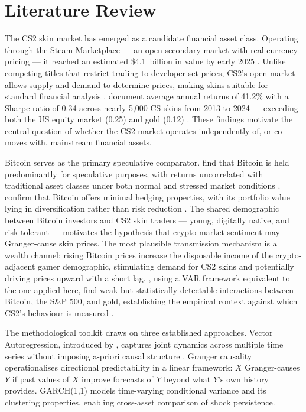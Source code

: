 \section{Literature Review}
\label{sec:literature}

The CS2 skin market has emerged as a candidate financial asset class. Operating
through the Steam Marketplace --- an open secondary market with real-currency
pricing --- it reached an estimated \$4.1~billion in value by early 2025
\cite{guedefernandez2025ai}. Unlike competing titles that restrict trading to
developer-set prices, CS2's open market allows supply and demand to determine
prices, making skins suitable for standard financial analysis
\cite{zhou2024cs2valorant}. \citeauthor{dobrynskaya2025videogame} document
average annual returns of 41.2\% with a Sharpe ratio of 0.34 across nearly
5,000 CS skins from 2013 to 2024 --- exceeding both the US equity market (0.25)
and gold (0.12) \cite{dobrynskaya2025videogame}. These findings motivate the
central question of whether the CS2 market operates independently of, or
co-moves with, mainstream financial assets.

Bitcoin serves as the primary speculative comparator. \citeauthor{baur2018bitcoin}
find that Bitcoin is held predominantly for speculative purposes, with returns
uncorrelated with traditional asset classes under both normal and stressed market
conditions \cite{baur2018bitcoin}. \citeauthor{bouri2017hedge} confirm that
Bitcoin offers minimal hedging properties, with its portfolio value lying in
diversification rather than risk reduction \cite{bouri2017hedge}. The shared
demographic between Bitcoin investors and CS2 skin traders --- young, digitally
native, and risk-tolerant --- motivates the hypothesis that crypto market
sentiment may Granger-cause skin prices. The most plausible transmission
mechanism is a wealth channel: rising Bitcoin prices increase the disposable
income of the crypto-adjacent gamer demographic, stimulating demand for CS2
skins and potentially driving prices upward with a short lag. \citeauthor{akin2024fluctuations},
using a VAR framework equivalent to the one applied here, find weak but
statistically detectable interactions between Bitcoin, the S\&P 500, and gold,
establishing the empirical context against which CS2's behaviour is measured
\cite{akin2024fluctuations}.

The methodological toolkit draws on three established approaches. Vector
Autoregression, introduced by \citeauthor{sims1980macroeconomics}, captures
joint dynamics across multiple time series without imposing a-priori causal
structure \cite{sims1980macroeconomics}. Granger causality
\cite{granger1969causal} operationalises directional predictability in a
linear framework: $X$ Granger-causes $Y$ if past values of $X$ improve
forecasts of $Y$ beyond what $Y$'s own history provides. GARCH(1,1) \cite{bollerslev1986garch} models time-varying
conditional variance and its clustering properties, enabling cross-asset
comparison of shock persistence.
